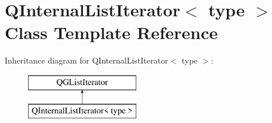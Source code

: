\hypertarget{class_q_internal_list_iterator}{}\section{Q\+Internal\+List\+Iterator$<$ type $>$ Class Template Reference}
\label{class_q_internal_list_iterator}
Inheritance diagram for Q\+Internal\+List\+Iterator$<$ type $>$\+:\begin{figure}[H]
\begin{center}
\leavevmode
\includegraphics[height=2.000000cm]{class_q_internal_list_iterator}
\end{center}
\end{figure}
